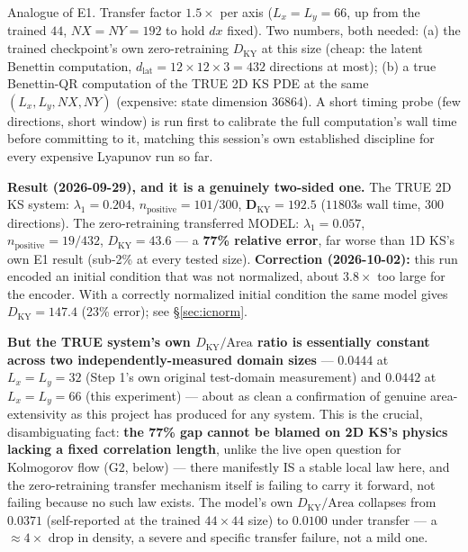 \documentclass[11pt]{article}
\begin{document}
\begin{description}[style=nextline,leftmargin=1.2em]

\item[G1 --- Ground-truth L-transfer, 2D KS.] \label{exp:g1}
Analogue of E1. Transfer factor $1.5\times$ per axis
($L_x=L_y=66$, up from the trained $44$, $NX=NY=192$ to hold $dx$
fixed). Two numbers, both needed: (a) the trained checkpoint's own
zero-retraining $D_{\mathrm{KY}}$ at this size (cheap: the latent
Benettin computation, $d_{\mathrm{lat}}=12{\times}12{\times}3=432$
directions at most); (b) a true Benettin-QR computation of the TRUE 2D
KS PDE at the same $(L_x,L_y,NX,NY)$ (expensive: state dimension
$36864$). A short timing probe (few directions, short window) is run
first to calibrate the full computation's wall time before committing
to it, matching this session's own established discipline for every
expensive Lyapunov run so far.

\textbf{Result (2026-09-29), and it is a genuinely two-sided one.} The
TRUE 2D KS system: $\lambda_1=0.204$, $n_{\mathrm{positive}}=101/300$,
$\boldsymbol{D_{\mathrm{KY}}=192.5}$ ($11803$s wall time, 300 directions).
The zero-retraining transferred MODEL: $\lambda_1=0.057$,
$n_{\mathrm{positive}}=19/432$, $D_{\mathrm{KY}}=43.6$ --- a
\textbf{77\% relative error}, far worse than 1D KS's own E1 result
(sub-2\% at every tested size).
\textbf{Correction (2026-10-02):} this run encoded an initial condition
that was not normalized, about $3.8\times$ too large for the encoder. With a
correctly normalized initial condition the same model gives
$D_{\mathrm{KY}}=147.4$ (23\% error); see \S\ref{sec:icnorm}.

\textbf{But the TRUE system's own $D_{\mathrm{KY}}/\mathrm{Area}$ ratio is
essentially constant across two independently-measured domain sizes} ---
$0.0444$ at $L_x{=}L_y{=}32$ (Step 1's own original test-domain
measurement) and $\mathbf{0.0442}$ at $L_x{=}L_y{=}66$ (this experiment)
--- about as clean a confirmation of genuine area-extensivity as this
project has produced for any system. This is the crucial, disambiguating
fact: \textbf{the 77\% gap cannot be blamed on 2D KS's physics lacking a
fixed correlation length}, unlike the live open question for Kolmogorov
flow (G2, below) --- there manifestly IS a stable local law here, and the
zero-retraining transfer mechanism itself is failing to carry it forward,
not failing because no such law exists. The model's own
$D_{\mathrm{KY}}/\mathrm{Area}$ collapses from $0.0371$ (self-reported at
the trained $44{\times}44$ size) to $\mathbf{0.0100}$ under transfer ---
a $\approx4\times$ drop in density, a severe and specific transfer
failure, not a mild one.


\end{description}
\end{document}
